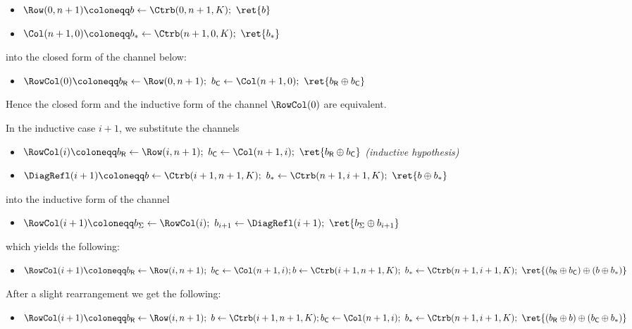 \begin{itemize}
\begin{itemize}
\item $\Row(0,n+1) \coloneqq b \leftarrow \Ctrb(0,n+1,K); \ \ret{b}$
\item $\Col(n+1,0) \coloneqq b_* \leftarrow \Ctrb(n+1,0,K); \ \ret{b_*}$
\end{itemize}
into the closed form of the channel below:
\begin{itemize}
\item $\RowCol(0) \coloneqq b_\mathsf{R} \leftarrow \Row(0,n+1); \ b_\mathsf{C} \leftarrow \Col(n+1,0); \ \ret{b_\mathsf{R} \oplus b_\mathsf{C}}$
\end{itemize}
Hence the closed form and the inductive form of the channel $\RowCol(0)$ are equivalent.

In the inductive case $i+1$, we substitute the channels
\begin{itemize}
\item $\RowCol(i) \coloneqq b_\mathsf{R} \leftarrow \Row(i,n+1); \ b_\mathsf{C} \leftarrow \Col(n+1,i); \ \ret{b_\mathsf{R} \oplus b_\mathsf{C}}$ \emph{(inductive hypothesis)}
\item $\DiagRefl(i+1) \coloneqq b \leftarrow \Ctrb(i+1,n+1,K); \ b_* \leftarrow \Ctrb(n+1,i+1,K); \ \ret{b \oplus b_*}$
\end{itemize}
into the inductive form of the channel
\begin{itemize}
\item $\RowCol(i+1) \coloneqq b_\Sigma \leftarrow \RowCol(i); \ b_{i+1} \leftarrow \DiagRefl(i+1); \ \ret{b_\Sigma \oplus b_{i+1}}$
\end{itemize}
which yields the following:
\begin{itemize}
\item $\RowCol(i+1) \coloneqq b_\mathsf{R} \leftarrow \Row(i,n+1); \ b_\mathsf{C} \leftarrow \Col(n+1,i); \\ b \leftarrow \Ctrb(i+1,n+1,K); \ b_* \leftarrow \Ctrb(n+1,i+1,K); \ \ret{(b_\mathsf{R} \oplus b_\mathsf{C}) \oplus (b \oplus b_*)}$
\end{itemize}
After a slight rearrangement we get the following:
\begin{itemize}
\item $\RowCol(i+1) \coloneqq b_\mathsf{R} \leftarrow \Row(i,n+1); \ b \leftarrow \Ctrb(i+1,n+1,K); \\ b_\mathsf{C} \leftarrow \Col(n+1,i); \ b_* \leftarrow \Ctrb(n+1,i+1,K); \ \ret{(b_\mathsf{R} \oplus b) \oplus (b_\mathsf{C} \oplus b_*)}$
\end{itemize}

\end{itemize}
